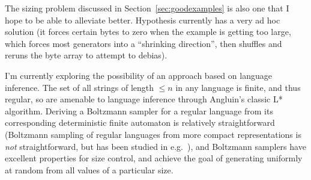 The sizing problem discussed in Section~\ref{sec:goodexamples} is also one that I hope to be able to alleviate better.
Hypothesis currently has a very ad hoc solution (it forces certain bytes to zero when the example is getting too large,
which forces most generators into a ``shrinking direction'',
then shuffles and reruns the byte array to attempt to debias).

I'm currently exploring the possibility of an approach based on language inference.
The set of all strings of length \(\leq n\) in any language is finite,
and thus regular,
so are amenable to language inference through Angluin's classic L* algorithm\cite{DBLP:journals/iandc/Angluin87}.
Deriving a Boltzmann sampler for a regular language from its corresponding deterministic finite automaton is relatively straightforward (Boltzmann sampling of regular languages from more compact representations is \emph{not} straightforward, but has been studied in e.g.~\cite{darrasse2010boltzmann}),
and Boltzmann samplers have excellent properties for size control,
and achieve the goal of generating uniformly at random from all values of a particular size.

\todototoc{}
\listoftodos{}



